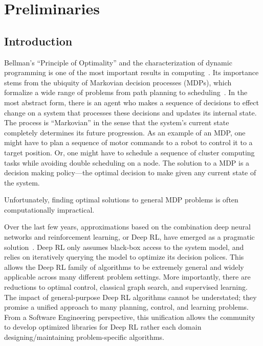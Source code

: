 \setcounter{secnumdepth}{0}
\chapter{Preliminaries}
\section{Introduction}
Bellman's ``Principle of Optimality'' and the characterization of dynamic programming is one of the most important results in computing~\cite{bellman2013dynamic}. Its importance stems from the ubiquity of Markovian decision processes (MDPs), which formalize a wide range of problems from path planning to scheduling~\cite{howard1966dynamic}. In the most abstract form, there is an agent who makes a sequence of decisions to effect change on a system that processes these decisions and updates its internal state. 
The process is ``Markovian'' in the sense that the system's current state completely determines its future progression. As an example of an MDP, one might have to plan a sequence of motor commands to a robot to control it to a target position. Or, one might have to schedule a sequence of cluster computing tasks while avoiding double scheduling on a node. 
The solution to a MDP is a decision making policy---the optimal decision to make given any current state of the system. 




Unfortunately, finding optimal solutions to general MDP problems is often computationally impractical. 





Over the last few years, approximations based on the combination deep neural networks and reinforcement learning, or Deep RL, have emerged as a pragmatic solution~\cite{mnih2015human,silver2017mastering}. Deep RL only assumes black-box access to the system model, and relies on iteratively querying the model to optimize its decision polices. This allows the Deep RL family of algorithms to be extremely general and widely applicable across many different problem settings. More importantly, there are reductions to optimal control, classical graph search, and supervised learning. The impact of general-purpose Deep RL algorithms cannot be understated; they promise a unified approach to many planning, control, and learning problems. 
From a Software Engineering perspective, this unification allows the community to develop optimized libraries for Deep RL rather each domain designing/maintaining problem-specific algorithms.

